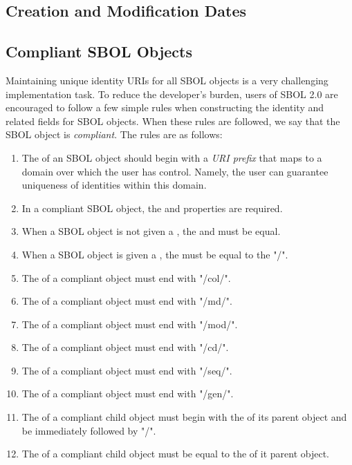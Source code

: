 \subsection{Creation and Modification Dates}


\subsection{Compliant SBOL Objects}
\label{sec:compliant}

Maintaining unique identity URIs for all SBOL objects is a very challenging implementation task.  To reduce the developer's burden, users of SBOL 2.0 are encouraged to follow a few simple rules when constructing the identity and related fields for SBOL objects.  When these rules are followed, we say that the SBOL object is \emph{compliant}.  The rules are as follows:
\begin{enumerate}
\item The  of an SBOL object should begin with a \emph{URI prefix} that maps to a domain over which the user has control.  Namely, the user can guarantee uniqueness of identities within this domain.
\item In a compliant SBOL object, the  and  properties are required.
\item When a SBOL object is not given a , the  and  must be equal.
\item When a SBOL object is given a , the  must be equal to the "/".
\item The  of a compliant  object must end with "/col/". 
\item The  of a compliant  object must end with "/md/". 
\item The  of a compliant  object  must end with "/mod/".
\item The  of a compliant  object must end with "/cd/". 
\item The  of a compliant  object must end with "/seq/". 
\item The  of a compliant  object must end with "/gen/". 
\item The  of a compliant child object must begin with the  of its parent object and be immediately followed by "/". 
\item The  of a compliant child object must be equal to the  of it parent object.
\end{enumerate}


